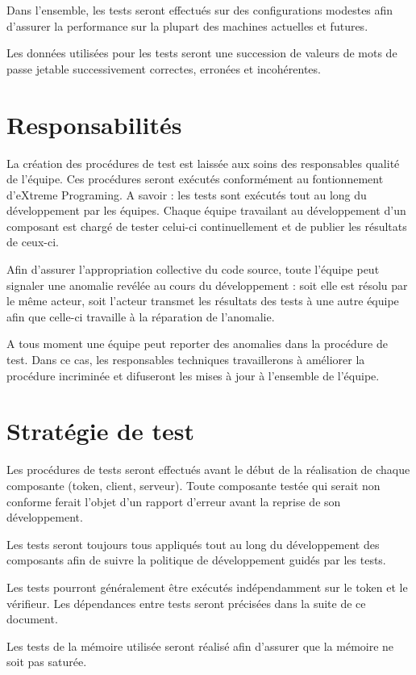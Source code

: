 \documentclass{"../../res/univ-projet"}
\begin{document}
  Dans l'ensemble, les tests seront effectués sur des configurations modestes afin d'assurer la performance sur la plupart des machines actuelles et futures.
  
  Les données utilisées pour les tests seront une succession de valeurs de mots de passe jetable successivement correctes, erronées et incohérentes.
  
  \section{Responsabilités}
  La création des procédures de test est laissée aux soins des responsables qualité de l'équipe. Ces procédures seront exécutés conformément au fontionnement d'eXtreme Programing. A savoir : les tests sont exécutés tout au long du développement par les équipes. Chaque équipe travailant au développement d'un composant est chargé de tester celui-ci continuellement et de publier les résultats de ceux-ci.
  
  Afin d'assurer l'appropriation collective du code source, toute l'équipe peut signaler une anomalie revélée au cours du développement : soit elle est résolu par le même acteur, soit l'acteur transmet les résultats 
des tests à une autre équipe afin que celle-ci travaille à la réparation de l'anomalie.
  
  A tous moment une équipe peut reporter des anomalies dans la procédure de test. Dans ce cas, les responsables techniques travaillerons à améliorer la procédure incriminée et difuseront les mises à jour à l'ensemble de l'équipe.
  
  \section{Stratégie de test}
  Les procédures de tests seront effectués avant le début de la réalisation de chaque composante (token, client, serveur). Toute composante testée qui serait non conforme ferait l'objet d'un 
  rapport d'erreur avant la reprise de son développement.
  
  Les tests seront toujours tous appliqués tout au long du développement des composants afin de suivre la politique de développement guidés par les tests.
    
  Les tests pourront généralement être exécutés indépendamment sur le token et le vérifieur. Les dépendances entre tests seront précisées dans la suite de ce document.
  
  Les tests de la mémoire utilisée seront réalisé afin d'assurer que la mémoire ne soit pas saturée.
  
\end{document}
